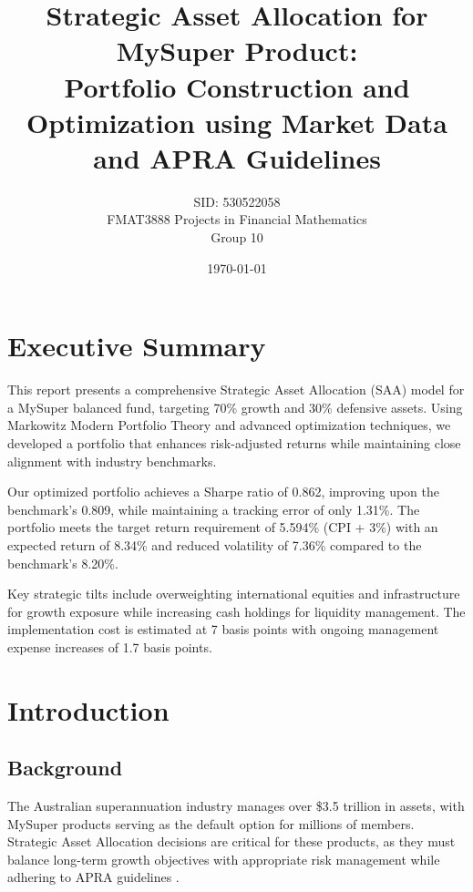 \documentclass[12pt,a4paper]{article}
\title{\textbf{Strategic Asset Allocation for MySuper Product: \\
Portfolio Construction and Optimization using Market Data and APRA Guidelines}}
\author{SID: 530522058 \\ FMAT3888 Projects in Financial Mathematics \\ Group 10}
\date{\today}
\begin{document}
\maketitle
\thispagestyle{empty}
\newpage

\tableofcontents
\newpage

\section{Executive Summary}

This report presents a comprehensive Strategic Asset Allocation (SAA) model for a MySuper balanced fund, targeting 70\% growth and 30\% defensive assets. Using Markowitz Modern Portfolio Theory and advanced optimization techniques, we developed a portfolio that enhances risk-adjusted returns while maintaining close alignment with industry benchmarks.

Our optimized portfolio achieves a Sharpe ratio of 0.862, improving upon the benchmark's 0.809, while maintaining a tracking error of only 1.31\%. The portfolio meets the target return requirement of 5.594\% (CPI + 3\%) with an expected return of 8.34\% and reduced volatility of 7.36\% compared to the benchmark's 8.20\%.

Key strategic tilts include overweighting international equities and infrastructure for growth exposure while increasing cash holdings for liquidity management. The implementation cost is estimated at 7 basis points with ongoing management expense increases of 1.7 basis points.

\section{Introduction}

\subsection{Background}
The Australian superannuation industry manages over \$3.5 trillion in assets, with MySuper products serving as the default option for millions of members. Strategic Asset Allocation decisions are critical for these products, as they must balance long-term growth objectives with appropriate risk management while adhering to APRA guidelines \cite{apra2025}.
\end{document}

